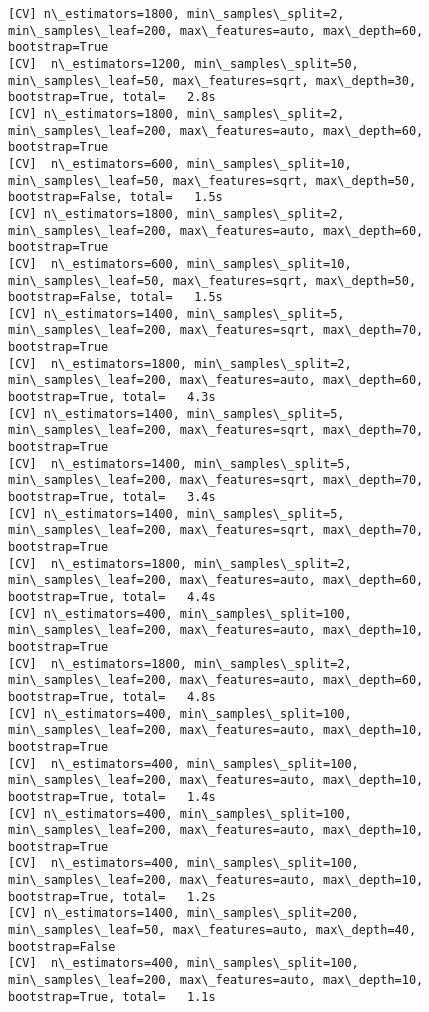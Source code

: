 \documentclass[11pt]{article}
\begin{document}
\begin{Verbatim}[commandchars=\\\{\}]
[CV] n\_estimators=1800, min\_samples\_split=2, min\_samples\_leaf=200, max\_features=auto, max\_depth=60, bootstrap=True 
[CV]  n\_estimators=1200, min\_samples\_split=50, min\_samples\_leaf=50, max\_features=sqrt, max\_depth=30, bootstrap=True, total=   2.8s
[CV] n\_estimators=1800, min\_samples\_split=2, min\_samples\_leaf=200, max\_features=auto, max\_depth=60, bootstrap=True 
[CV]  n\_estimators=600, min\_samples\_split=10, min\_samples\_leaf=50, max\_features=sqrt, max\_depth=50, bootstrap=False, total=   1.5s
[CV] n\_estimators=1800, min\_samples\_split=2, min\_samples\_leaf=200, max\_features=auto, max\_depth=60, bootstrap=True 
[CV]  n\_estimators=600, min\_samples\_split=10, min\_samples\_leaf=50, max\_features=sqrt, max\_depth=50, bootstrap=False, total=   1.5s
[CV] n\_estimators=1400, min\_samples\_split=5, min\_samples\_leaf=200, max\_features=sqrt, max\_depth=70, bootstrap=True 
[CV]  n\_estimators=1800, min\_samples\_split=2, min\_samples\_leaf=200, max\_features=auto, max\_depth=60, bootstrap=True, total=   4.3s
[CV] n\_estimators=1400, min\_samples\_split=5, min\_samples\_leaf=200, max\_features=sqrt, max\_depth=70, bootstrap=True 
[CV]  n\_estimators=1400, min\_samples\_split=5, min\_samples\_leaf=200, max\_features=sqrt, max\_depth=70, bootstrap=True, total=   3.4s
[CV] n\_estimators=1400, min\_samples\_split=5, min\_samples\_leaf=200, max\_features=sqrt, max\_depth=70, bootstrap=True 
[CV]  n\_estimators=1800, min\_samples\_split=2, min\_samples\_leaf=200, max\_features=auto, max\_depth=60, bootstrap=True, total=   4.4s
[CV] n\_estimators=400, min\_samples\_split=100, min\_samples\_leaf=200, max\_features=auto, max\_depth=10, bootstrap=True 
[CV]  n\_estimators=1800, min\_samples\_split=2, min\_samples\_leaf=200, max\_features=auto, max\_depth=60, bootstrap=True, total=   4.8s
[CV] n\_estimators=400, min\_samples\_split=100, min\_samples\_leaf=200, max\_features=auto, max\_depth=10, bootstrap=True 
[CV]  n\_estimators=400, min\_samples\_split=100, min\_samples\_leaf=200, max\_features=auto, max\_depth=10, bootstrap=True, total=   1.4s
[CV] n\_estimators=400, min\_samples\_split=100, min\_samples\_leaf=200, max\_features=auto, max\_depth=10, bootstrap=True 
[CV]  n\_estimators=400, min\_samples\_split=100, min\_samples\_leaf=200, max\_features=auto, max\_depth=10, bootstrap=True, total=   1.2s
[CV] n\_estimators=1400, min\_samples\_split=200, min\_samples\_leaf=50, max\_features=auto, max\_depth=40, bootstrap=False 
[CV]  n\_estimators=400, min\_samples\_split=100, min\_samples\_leaf=200, max\_features=auto, max\_depth=10, bootstrap=True, total=   1.1s

\end{Verbatim}
\end{document}
